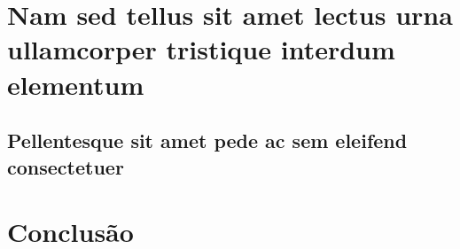 \documentclass[
	12pt,				%
	openright,			%
	oneside,			%
	a4paper,			%
	english,			%
	brazil				%
	]{abntex2}
\providecommand{\lipsum}[1][]{}
\begin{document}
\lipsum[21-22]

\chapter{Nam sed tellus sit amet lectus urna ullamcorper tristique interdum
elementum}

\section{Pellentesque sit amet pede ac sem eleifend consectetuer}

\lipsum[24]


\chapter{Conclusão}

\lipsum[31-33]

\postextual



%
%

\end{document}
